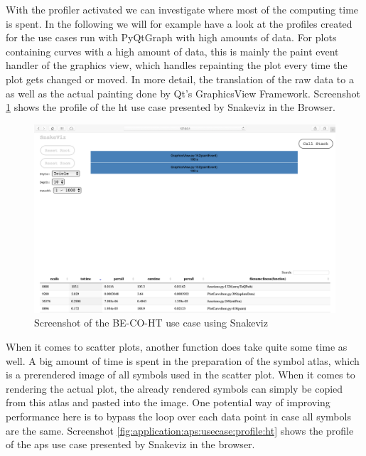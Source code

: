 With the profiler activated we can investigate where most of the computing time
is spent. In the following we will for example have a look at the profiles
created for the use cases run with PyQtGraph with high amounts of data. For
plots containing curves with a high amount of data, this is mainly the paint
event handler of the graphics view, which handles repainting the plot every time
the plot gets changed or moved. In more detail, the translation of the raw data
to a  as well as the actual painting done
by Qt's GraphicsView Framework. Screenshot
\ref{fig:application:lhc:usecase:profile:ht} shows the profile of the \gls{ht}
use case presented by Snakeviz in the Browser.

\begin{figure}[h]
    \centering
    \includegraphics[width=15cm]{resources/img/profiles/HtProfile}
    \caption{Screenshot of the BE-CO-HT use case using Snakeviz}
    \label{fig:application:lhc:usecase:profile:ht}
\end{figure}

When it comes to scatter plots, another function does take quite some time as
well. A big amount of time is spent in the preparation of the symbol atlas,
which is a prerendered image of all symbols used in the scatter plot. When it
comes to rendering the actual plot, the already rendered symbols can simply be
copied from this atlas and pasted into the image. One potential way of improving
performance here is to bypass the loop over each data point in case all symbols
are the same. Screenshot \ref{fig:application:aps:usecase:profile:ht} shows the
profile of the \gls{aps} use case presented by Snakeviz in the browser.


